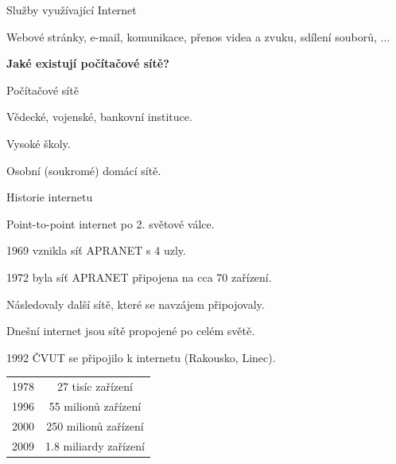 \documentclass[aspectratio=169]{beamer}
\begin{document}
\begin{frame}{Služby využívající Internet}
    \begin{cardTiny}
        \begin{center}
            Webové stránky, e-mail, komunikace, přenos videa a zvuku, sdílení souborů, ...
        \end{center}
    \end{cardTiny}
    \begin{cardTiny}
        \begin{flushleft}
        \begin{center}
            \textbf{Jaké existují počítačové sítě?}
        \end{center}
        \end{flushleft}
    \end{cardTiny}
\end{frame}

\begin{frame}{Počítačové sítě}
    \begin{cardTiny}
        \begin{center}
            Vědecké, vojenské, bankovní instituce.

            Vysoké školy.

            Osobní (soukromé) domácí sítě.
        \end{center}
    \end{cardTiny}
\end{frame}

\begin{frame}{Historie internetu}
    \begin{cardTiny}
        \begin{flushleft}
            Point-to-point internet po 2. světové válce.

            1969 vznikla síť APRANET s 4 uzly.

            1972 byla síť APRANET připojena na cca 70 zařízení.

            Následovaly další sítě, které se navzájem připojovaly.

            Dnešní internet jsou sítě propojené po celém světě.

            1992 ČVUT se připojilo k internetu (Rakousko, Linec).
        \end{flushleft}
    \end{cardTiny}
    \begin{cardTiny}
        \begin{center}
            \begin{tabular}{ |c|c| } 
                \hline
                1978 & 27 tisíc zařízení        \\
                1996 & 55 milionů zařízení      \\
                2000 & 250 milionů zařízení     \\
                2009 & 1.8 miliardy zařízení    \\
                \hline
            \end{tabular}
        \end{center}
    \end{cardTiny}
\end{frame}
\end{document}
